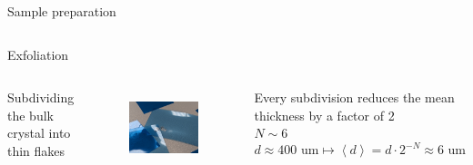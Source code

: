 \documentclass[
	10pt,
]{beamer}
\begin{document}
\begin{frame}{Sample preparation}
\begin{columns}
	\end{columns}
\end{frame}

\begin{frame}{Exfoliation}
	\begin{columns}
		Subdividing the bulk crystal into thin flakes
		\begin{figure}
					\centering
					\includegraphics[width=\textwidth]{../../photos/exfoliation.jpg}\\
		\end{figure}
		Every subdivision reduces the mean thickness by a factor of 2\\
		$N\sim 6$\\
		$$d\approx 400\text{ um}  \mapsto \left<d\right> = d\cdot2^{-N} \approx 6\text{ um}$$


\end{columns}
\end{frame}
\end{document}
